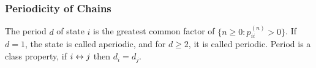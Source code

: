 \subsubsection*{Periodicity of Chains}
 The period $d$ of state $i$ is the greatest common factor of $\{n \ge 0 : p^{(n)}_{ii} > 0 \}$. If $d = 1$, the state is called aperiodic, and for $d \ge 2$, it is called periodic.
 Period is a class property, if $i \leftrightarrow j$ then $d_i = d_j$.